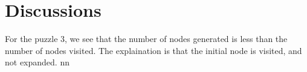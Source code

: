 \documentclass[]{article}
\begin{document}










\section{Discussions}

For the puzzle 3, we see that the number of nodes generated is less than the number of nodes visited.
The explaination is that the initial node is visited, and not expanded.
nn
\end{document}
